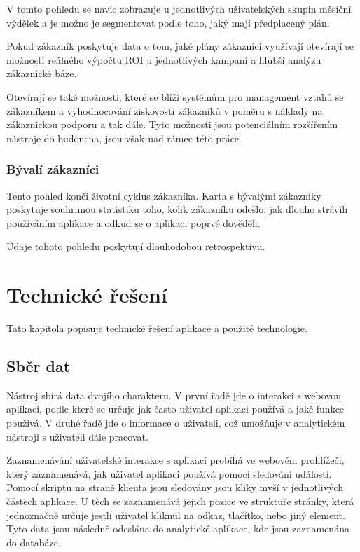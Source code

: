 \documentclass[bc,male,java,dept456]{diploma}						%
\begin{document}
V tomto pohledu se navíc zobrazuje u jednotlivých uživatelských skupin měsíční výdělek a je možno je segmentovat podle toho, jaký mají předplacený plán. 

Pokud zákazník poskytuje data o tom, jaké plány zákazníci využívají otevírají se možnosti reálného výpočtu ROI u jednotlivých kampaní a hlubší analýzu zákaznické báze.

Otevírají se také možnosti, které se blíží systémům pro management vztahů se zá\-kaz\-ní\-kem a vyhodnocování ziskovosti zákazníků v poměru s náklady na zákaznickou podporu a tak dále. Tyto možnosti jsou potenciálním rozšířením nástroje do budoucna, jsou však nad rámec této práce.


\subsubsection{Bývalí zákazníci}

Tento pohled končí životní cyklus zákazníka. Karta s bývalými zákazníky poskytuje souhrnnou statistiku toho, kolik zákazníku odešlo, jak dlouho strávili používáním aplikace a odkud se o aplikaci poprvé dověděli.

Údaje tohoto pohledu poskytují dlouhodobou retrospektivu.




\section{Technické řešení}

Tato kapitola popisuje technické řešení aplikace a použité technologie. 



\subsection{Sběr dat}

Nástroj sbírá data dvojího charakteru. V první řadě jde o interakci s webovou aplikací, podle které se určuje jak často uživatel aplikaci používá a jaké funkce používá. V druhé řadě jde o informace o uživateli, což umožňuje v analytickém nástroji s uživateli dále pracovat.

Zaznamenávání uživatelské interakce s aplikací probíhá ve webovém prohlížeči, který zaznamenává, jak uživatel aplikaci používá pomocí sledování událostí. Pomocí skriptu na straně klienta jsou sledovány jsou kliky myší v jednotlivých částech aplikace. U těch se zaznamenává jejich pozice ve struktuře stránky, která jednoznačně určuje jestli uživatel kliknul na odkaz, tlačítko, nebo jiný element. Tyto data jsou následně odeslána do analytické aplikace, kde jsou zaznamenána do databáze.
\end{document}
